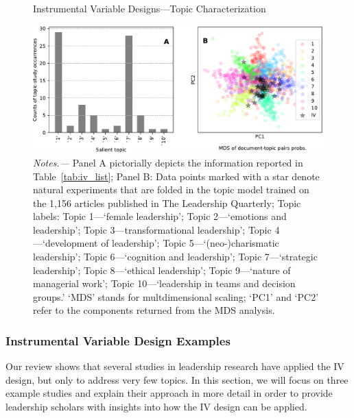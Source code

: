 \documentclass[english]{article}
\begin{document}
\begin{figure}[!htbp] 
	\centering
	\label{fig:iv_mds}
	\caption{Instrumental Variable Designs---Topic Characterization}
	\includegraphics[width=1\textwidth]{_2}
	\caption*{\small\textit{Notes.---} Panel A pictorially depicts the
		information reported in Table~\ref{tab:iv_list}; Panel B: Data points
		marked with a star denote natural experiments that are folded
		in the topic model trained on the 1,156 articles published in The
		Leadership Quarterly; Topic labels: Topic 1---`female
		leadership'; Topic 2---`emotions and leadership';
		Topic 3---transformational leadership'; Topic 4---`development
		of leadership'; Topic 5---`(neo-)charismatic leadership'; Topic
		6---`cognition and leadership'; Topic 7---`strategic
		leadership'; Topic 8---`ethical leadership'; Topic 9---`nature
		of managerial work'; Topic 10---`leadership
		in teams and decision groups.' `MDS' stands for
		multdimensional scaling; `PC1' and `PC2' refer to the
components returned from the MDS analysis.}
\end{figure}


\subsubsection{Instrumental Variable Design Examples}

\noindent Our review shows that several studies in leadership research have
applied the IV design, but only to address very few topics. In this
section, we will focus on three example studies and explain their
approach in more detail in order to provide leadership scholars with
insights into how the IV design can be applied.
\end{document}
